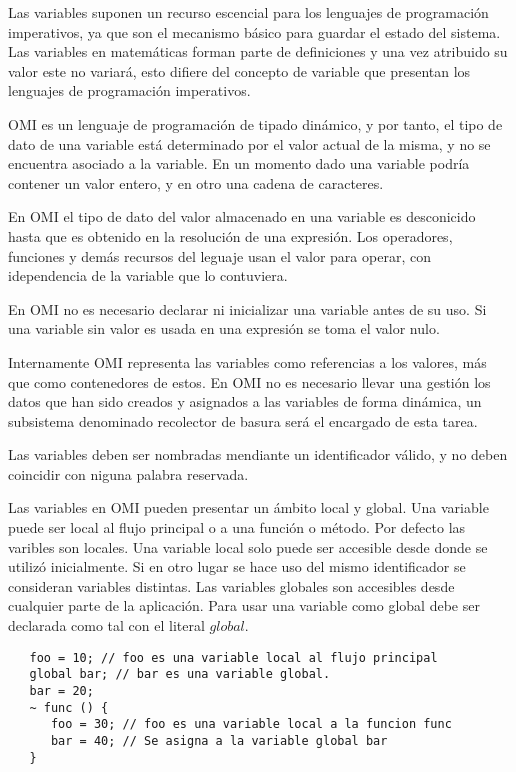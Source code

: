 Las variables suponen un recurso escencial para los lenguajes de programación imperativos, ya que son el mecanismo básico para guardar el estado del sistema. Las variables en matemáticas
forman parte de definiciones y una vez atribuido su valor este no variará, esto difiere del concepto de variable que presentan los lenguajes de programación imperativos. 


OMI es un lenguaje de programación de tipado dinámico, y por tanto, el tipo de dato de una variable está determinado por el valor actual de la misma, y no se encuentra 
asociado a la variable. En un momento dado una variable podría contener un valor entero, y en otro una cadena de caracteres. 

En OMI el tipo de dato del valor almacenado en una variable es desconicido hasta que es obtenido en la resolución de una expresión. Los operadores, funciones y demás recursos
del leguaje usan el valor para operar, con idependencia de la variable que lo contuviera.

En OMI no es necesario declarar ni inicializar una variable antes de su uso. Si una variable sin valor es usada en una expresión se toma el valor nulo.

Internamente OMI representa las variables como referencias a los valores, más que como contenedores de estos. En OMI no es necesario llevar una gestión los datos que han sido
creados y asignados a las variables de forma dinámica, un subsistema denominado recolector de basura será el encargado de esta tarea.

Las variables deben ser nombradas mendiante un identificador válido, y no deben coincidir con niguna palabra reservada. 

Las variables en OMI pueden presentar un ámbito local y global. Una variable puede ser local al flujo principal o a una función o método. Por defecto las varibles son locales.
Una variable local solo puede ser accesible desde donde se utilizó inicialmente. Si en otro lugar se hace uso del mismo identificador se consideran variables distintas.
Las variables globales son accesibles desde cualquier parte de la aplicación. Para usar una variable como global debe ser declarada como tal con el literal $global$. \\


\begin{lstlisting}
   foo = 10; // foo es una variable local al flujo principal
   global bar; // bar es una variable global.
   bar = 20; 
   ~ func () {
      foo = 30; // foo es una variable local a la funcion func
      bar = 40; // Se asigna a la variable global bar
   }
\end{lstlisting}

